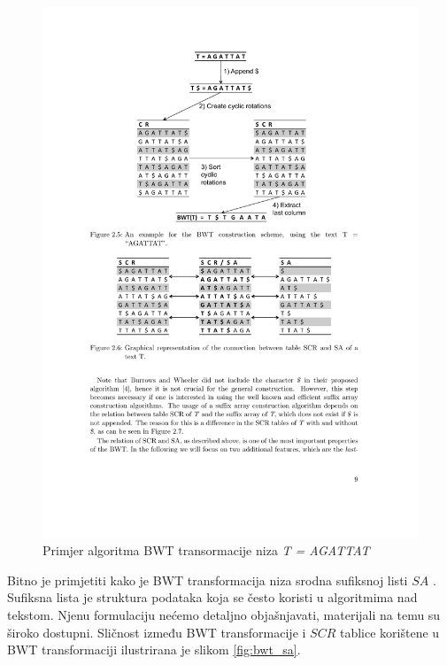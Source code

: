 \documentclass[times, utf8, seminar, numeric]{fer}
\begin{document}
\begin{figure}[!htb]
\centering
\includegraphics{fig/bwt.pdf}
\caption{Primjer algoritma BWT transormacije niza \textit{T = AGATTAT}}
\label{fig:bwt}
\end{figure}

Bitno je primjetiti kako je BWT transformacija niza srodna sufiksnoj listi $SA$ . Sufiksna lista
je struktura podataka koja se često koristi u algoritmima nad tekstom. Njenu formulaciju
nećemo detaljno objašnjavati, materijali na temu su široko dostupni. Sličnost između BWT
transformacije i $SCR$ tablice korištene u BWT transformaciji ilustrirana je slikom \ref{fig:bwt_sa}.
\end{document}
